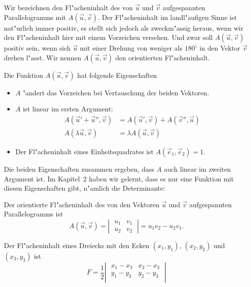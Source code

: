 Wir bezeichnen den Fl"acheninhalt des von $\vec u$ und $\vec v$ aufgespannten
Parallelogramms mit $A(\vec u,\vec v)$.
Der Fl"acheninhalt im landl"aufigen
Sinne ist nat"urlich immer positiv, es stellt sich jedoch als
zweckm"assig heraus, wenn wir den Fl"acheninhalt hier mit einem
Vorzeichen versehen.
Und zwar soll $A(\vec u,\vec v)$ positiv sein, wenn
sich $\vec u$ mit einer Drehung von weniger als $180^\circ$ in den Vektor
$\vec v$ drehen l"asst.
Wir nennen $A(\vec u, \vec v)$ den orientierten
Fl"acheninhalt.

Die Funktion $A(\vec u,\vec v)$ hat folgende Eigenschaften
\begin{itemize}
\item $A$ "andert das Vorzeichen bei Vertauschung der beiden Vektoren.
\item $A$ ist linear im ersten Argument:
\begin{align*}
A(\vec u'+\vec u'',\vec v)&=A(\vec u',\vec v)+A(\vec v'',\vec u)
\\
A(\lambda \vec u,\vec v)&=\lambda A(\vec u,\vec v)
\end{align*}
\item Der Fl"acheninhalt eines Einheitsquadrates ist $A(\vec e_1,\vec e_2)=1$.
\end{itemize}
Die beiden Eigenschaften zusammen ergeben, dass $A$ auch linear im
zweiten Argument ist.
Im Kapitel~2 haben wir gelernt, dass es nur eine
Funktion mit diesen Eigenschaften gibt, n"amlich die Determinante:
\begin{satz}
Der orientierte Fl"acheninhalt des von den Vektoren $\vec u$ und $\vec v$
aufgespannten Parallelogramms ist
\[
A(\vec u,\vec v)=\left|\;\begin{matrix}u_1&v_1\\u_2&v_2\end{matrix}\;\right|
=u_1v_2-u_2v_1
.
\]
\end{satz}
\begin{satz}
Der Fl"acheninhalt eines Dreiecks mit den Ecken $(x_1,y_1)$, $(x_2,y_2)$ und
$(x_3,y_3)$ ist
\[
F=
\frac12\left|\;
\begin{matrix}
x_1-x_3&x_2-x_3\\
y_1-y_3&y_2-y_3\\
\end{matrix}
\;\right|
\]
\end{satz}

